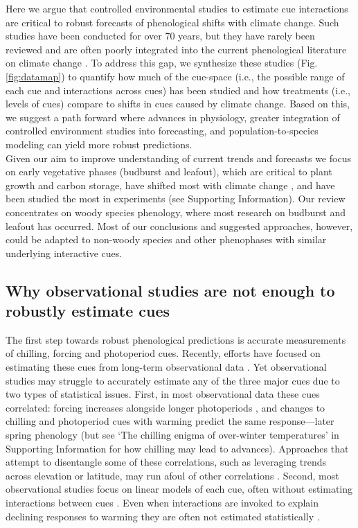 \documentclass[11pt,letter]{article}
\newcommand{\R}[1]{\label{#1}\linelabel{#1}}
\begin{document}
Here we argue that controlled environmental studies to estimate cue interactions are critical to robust forecasts of phenological shifts with climate change. Such studies have been conducted for over 70 years, but they have rarely been reviewed and are often poorly integrated into the current phenological literature on climate change \citep[e.g.,][]{fu2015,richardson2018}. To address this gap, we synthesize these studies (Fig. \ref{fig:datamap}) to quantify how much of the cue-space (i.e., the possible range of each cue and interactions across cues) has been studied and how treatments (i.e., levels of cues) compare to shifts in cues caused by climate change. Based on this, we suggest a path forward where advances in physiology, greater integration of controlled environment studies into  forecasting, and \R{molecpop}population-to-species modeling can yield more robust predictions.\\ 

Given our aim to improve understanding of current trends and forecasts we focus on early vegetative phases (budburst and leafout), which are critical to plant growth and carbon storage, have shifted most with climate change \citep{Cleland:2007or}, and have been studied the most in experiments (see Supporting Information). Our review concentrates on woody species phenology, where most research on budburst and leafout has occurred. Most of our conclusions and suggested approaches, however, could be adapted to non-woody species and other phenophases with similar underlying interactive cues. 

\subsection{Why observational studies are not enough to robustly estimate cues}
The first step towards robust phenological predictions is accurate measurements of chilling, forcing and photoperiod cues. Recently, efforts have focused on estimating these cues from long-term observational data \citep[e.g.,][]{lued2013diff}. Yet observational studies may struggle to accurately estimate any of the three major cues due to two types of statistical issues. First, in most observational data these cues correlated: forcing increases alongside longer photoperiods \citep{sarahailene2020}, and changes to chilling and photoperiod cues with warming predict the same response---later spring phenology \R{addreftochillsupp}(but see `The chilling enigma of over-winter temperatures' in Supporting Information for how chilling may lead to advances). Approaches that attempt to disentangle some of these correlations, such as leveraging trends across elevation or latitude, may run afoul of other correlations \citep[][]{tansey2017}. Second, most observational studies focus on linear models of each cue, often without \R{smtweakstat1}estimating interactions between cues \citep{visser2001,polgar2014}. Even when interactions are invoked to explain declining responses to warming they are often not estimated \R{smtweakstat2}statistically \citep[e.g.,][]{fu2015}.\\
\end{document}
